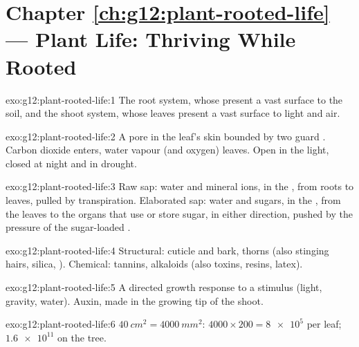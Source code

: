 \section*{Chapter \ref{ch:g12:plant-rooted-life} --- Plant Life: Thriving While Rooted}

\begin{solution}{exo:g12:plant-rooted-life:1}
The root system, whose  present a vast surface to the soil,
and the shoot system, whose leaves present a vast surface to light and
air.
\end{solution}

\begin{solution}{exo:g12:plant-rooted-life:2}
A pore in the leaf's skin bounded by two guard . Carbon dioxide
enters, water vapour (and oxygen) leaves. Open in the light, closed at
night and in drought.
\end{solution}

\begin{solution}{exo:g12:plant-rooted-life:3}
Raw sap: water and mineral ions, in the , from roots to leaves,
pulled by transpiration. Elaborated sap: water and sugars, in the
, from the leaves to the organs that use or store sugar, in
either direction, pushed by the pressure of the sugar-loaded .
\end{solution}

\begin{solution}{exo:g12:plant-rooted-life:4}
Structural: cuticle and bark, thorns (also stinging hairs, silica,
). Chemical: tannins, alkaloids (also toxins, resins,
latex).
\end{solution}

\begin{solution}{exo:g12:plant-rooted-life:5}
A directed growth response to a stimulus (light, gravity, water).
Auxin, made in the growing tip of the shoot.
\end{solution}

\begin{solution}{exo:g12:plant-rooted-life:6}
$\qty{40}{cm^2} = \qty{4000}{mm^2}$: $4000 \times 200 = \num{8e5}$
 per leaf; $\num{1.6e11}$ on the tree.
\end{solution}


